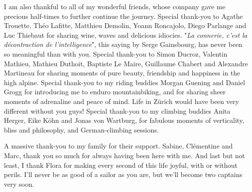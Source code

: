 I am also thankful to all of my wonderful friends, whose company gave me precious half-times to further continue the journey.
% 
Special thank-you to Agathe Trouette, Théo Lafitte, Matthieu Demolin, Yoann Roncajolo, Diego Parlange and Luc Thiebaut for sharing wine, waves and delicious idiocies. "\textit{La connerie, c'est la décontraction de l'intelligence}", this saying by Serge Gainsbourg, has never been so meaningful than with you.
% 
Special thank-you to Simon Ducroz, Valentin Mathieu, Mathieu Duthoit, Baptiste Le Maire, Guillaume Chabert and Alexandre Martineau for sharing moments of pure beauty, friendship and happiness in the high alpine.
% 
Special thank-you to my riding buddies Morgan Guening and Daniel Grogg for introducing me to enduro mountainbiking, and for sharing sheer moments of adrenaline and peace of mind. Life in Zürich would have been very different without you guys! 
% 
Special thank-you to my climbing buddies Anita Herger, Eike Köhn and Jonas von Wartburg, for fabulous moments of verticality, bliss and philosophy, and German-climbing sessions.

A massive thank-you to my family for their support. Sabine, Clémentine and Marc, thank you so much for always having been here with me. 
% 
And last but not least, I thank Flora for making every second of this life joyful, with or without perils.
% 
I'll never be as good of a sailor as you are, but we'll become two captains very soon.
















